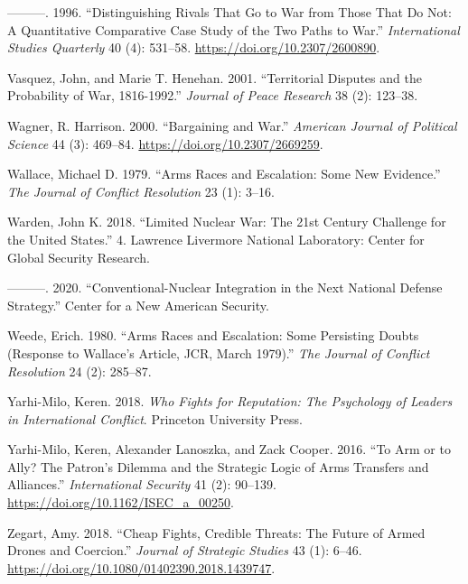 \documentclass[
]{article}
\begin{document}
\leavevmode\hypertarget{ref-vasquez_distinguishingrivalsthat_1996}{}%
---------. 1996. ``Distinguishing Rivals That Go to War from Those That Do Not: A Quantitative Comparative Case Study of the Two Paths to War.'' \emph{International Studies Quarterly} 40 (4): 531--58. \url{https://doi.org/10.2307/2600890}.

\leavevmode\hypertarget{ref-vasquez_territorialdisputesprobability_2001}{}%
Vasquez, John, and Marie T. Henehan. 2001. ``Territorial Disputes and the Probability of War, 1816-1992.'' \emph{Journal of Peace Research} 38 (2): 123--38.

\leavevmode\hypertarget{ref-wagner_bargainingwar_2000}{}%
Wagner, R. Harrison. 2000. ``Bargaining and War.'' \emph{American Journal of Political Science} 44 (3): 469--84. \url{https://doi.org/10.2307/2669259}.

\leavevmode\hypertarget{ref-wallace_armsracesescalation_1979}{}%
Wallace, Michael D. 1979. ``Arms Races and Escalation: Some New Evidence.'' \emph{The Journal of Conflict Resolution} 23 (1): 3--16.

\leavevmode\hypertarget{ref-warden_limitednuclearwar_2018}{}%
Warden, John K. 2018. ``Limited Nuclear War: The 21st Century Challenge for the United States.'' 4. Lawrence Livermore National Laboratory: Center for Global Security Research.

\leavevmode\hypertarget{ref-warden_conventionalnuclearintegrationnext_2020}{}%
---------. 2020. ``Conventional-Nuclear Integration in the Next National Defense Strategy.'' Center for a New American Security.

\leavevmode\hypertarget{ref-weede_armsracesescalation_1980}{}%
Weede, Erich. 1980. ``Arms Races and Escalation: Some Persisting Doubts (Response to Wallace's Article, JCR, March 1979).'' \emph{The Journal of Conflict Resolution} 24 (2): 285--87.

\leavevmode\hypertarget{ref-yarhi-milo_whofightsreputation_2018}{}%
Yarhi-Milo, Keren. 2018. \emph{Who Fights for Reputation: The Psychology of Leaders in International Conflict}. Princeton University Press.

\leavevmode\hypertarget{ref-yarhi-milo_armallypatron_2016}{}%
Yarhi-Milo, Keren, Alexander Lanoszka, and Zack Cooper. 2016. ``To Arm or to Ally? The Patron's Dilemma and the Strategic Logic of Arms Transfers and Alliances.'' \emph{International Security} 41 (2): 90--139. \url{https://doi.org/10.1162/ISEC_a_00250}.

\leavevmode\hypertarget{ref-zegart_cheapfightscredible_2018}{}%
Zegart, Amy. 2018. ``Cheap Fights, Credible Threats: The Future of Armed Drones and Coercion.'' \emph{Journal of Strategic Studies} 43 (1): 6--46. \url{https://doi.org/10.1080/01402390.2018.1439747}.
\end{document}
